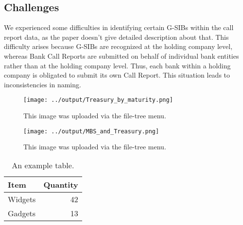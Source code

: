 \documentclass{article}
\begin{document}
\subsection{Challenges}

We experienced some difficulties in identifying certain G-SIBs within the call report data, as the paper doesn't give detailed description about that. This difficulty arises because G-SIBs are recognized at the holding company level, whereas Bank Call Reports are submitted on behalf of individual bank entities rather than at the holding company level. Thus, each bank within a holding company is obligated to submit its own Call Report. This situation leads to inconsistencies in naming.




\begin{figure}
\centering
\texttt{[image: ../output/Treasury\_by\_maturity.png]}
\caption{\label{fig:myplot}This image was uploaded via the file-tree menu.}
\end{figure}

\begin{figure}
\centering
\texttt{[image: ../output/MBS\_and\_Treasury.png]}
\caption{\label{fig:myplot}This image was uploaded via the file-tree menu.}
\end{figure}

\begin{table}
\centering
\begin{tabular}{l|r}
Item & Quantity \\\hline
Widgets & 42 \\
Gadgets & 13
\end{tabular}
\caption{\label{tab:widgets}An example table.}
\end{table}




\end{document}
